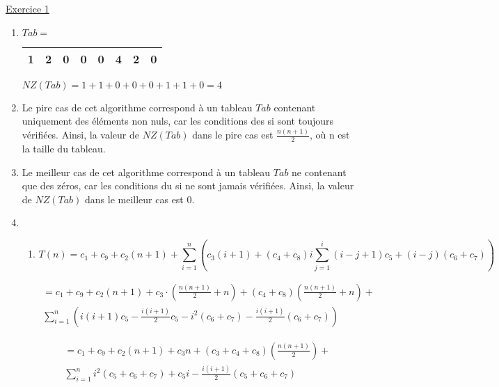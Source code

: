 \documentclass[11pt]{article}
\begin{document}
\underline{Exercice 1} 
\begin{enumerate}[label=\Roman*.]
\item 

  $Tab=$ \begin{tabular}{|c|c|c|c|c|c|c|c|}
\hline
     1  & 2 & 0  &0 & 0 &4 & 2 &0 \\
    \hline
\end{tabular}

\bigskip

$NZ(Tab) = 1 + 1 + 0 + 0 + 0 + 1 + 1 + 0 = 4$


\item 
 Le pire cas de cet algorithme correspond à un tableau $Tab$ contenant uniquement des éléments non nuls, car les conditions des si sont toujours vérifiées. Ainsi, la valeur de $NZ(Tab)$ dans le pire cas est $\frac{n(n+1)}{2}$, où n est la taille du tableau.

\item 
Le meilleur cas de cet algorithme correspond à un tableau $Tab$ ne contenant que des zéros, car les conditions du si ne sont jamais vérifiées. Ainsi, la valeur de $NZ(Tab)$ dans le meilleur cas est 0.


\item 

\begin{enumerate}[label=\alph*)]

     \item 
     
     \begin{equation*}
          T(n) = c_1 + c_9 + c_2(n+1)+ \sum_{i=1}^{n}\left(c_3(i+1)+(c_4+c_8)i\sum_{j=1}^{i}(i-j+1)c_5+(i-j)(c_6+c_7)\right)
     \end{equation*}
        
         \begin{multline*}
         = c_1 + c_9 + c_2(n+1)+ c_3\cdot \left(\frac{n(n+1)}{2}+n\right)+(c_4+c_8)\left(\frac{n(n+1)}{2}+n\right)+\\
         \sum_{i=1}^{n}\left(i(i+1)c_5-\frac{i(i+1)}{2}c_5-i^{2}(c_6+c_7)-\frac{i(i+1)}{2}(c_6+c_7) \right)
         \end{multline*}

         \begin{multline*}
           = c_1 + c_9 + c_2(n+1)+ c_3n+ (c_3+c_4+c_8)\left(\frac{n(n+1)}{2}\right)+\\
           \sum_{i=1}^{n}i^{2}(c_5+c_6+c_7)+c_5i-\frac{i(i+1)}{2}(c_5+c_6+c_7) 
         \end{multline*}
         

\end{enumerate}
\end{enumerate}
\end{document}
